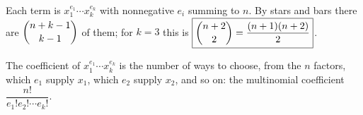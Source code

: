 Each term is $x_1^{e_1}\cdots x_k^{e_k}$ with nonnegative $e_i$ summing to $n$. By stars and bars there are $\dbinom{n+k-1}{k-1}$ of them; for $k=3$ this is $\boxed{\dbinom{n+2}{2}=\dfrac{(n+1)(n+2)}{2}}$.

The coefficient of $x_1^{e_1}\cdots x_k^{e_k}$ is the number of ways to choose, from the $n$ factors, which $e_1$ supply $x_1$, which $e_2$ supply $x_2$, and so on: the multinomial coefficient $\dfrac{n!}{e_1!e_2!\cdots e_k!}$.
